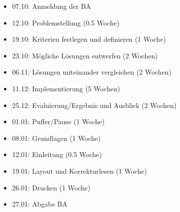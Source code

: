 \begin{itemize}
\item
  07.10: Anmeldung der BA
\item
  12.10: Problemstellung (0.5 Woche)
\item
  19.10: Kriterien festlegen und definieren (1 Woche)
\item
  23.10: Mögliche Lösungen entwerfen (2 Wochen)
\item
  06.11: Lösungen miteinander vergleichen (2 Wochen)
\item
  11.12: Implementierung (5 Wochen)
\item
  25.12: Evaluierung/Ergebnis und Ausblick (2 Wochen)
\item
  01.01: Puffer/Pause (1 Woche)
\item
  08.01: Grundlagen (1 Woche)
\item
  12.01: Einleitung (0.5 Woche)
\item
  19.01: Layout und Korrekturlesen (1 Woche)
\item
  26.01: Drucken (1 Woche)
\item
  27.01: Abgabe BA
\end{itemize}
